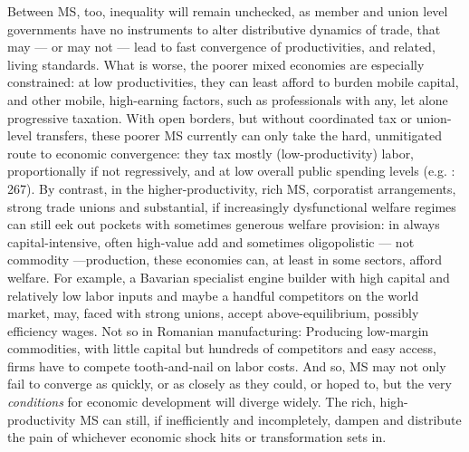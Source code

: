 \documentclass[11pt,a4paper,oneside,openright]{article}
\begin{document}
Between \gls{MS}, too, inequality will remain unchecked, as member and union level governments have no instruments to alter distributive dynamics of trade, that may --- or may not --- lead to fast convergence of productivities, and related, living standards. 
What is worse, the poorer mixed economies are especially constrained: 
at low productivities, they can least afford to burden mobile capital, and other mobile, high-earning factors, such as professionals with any, let alone progressive taxation. 
With open borders, but without coordinated tax or union-level transfers, these poorer \gls{MS} currently can only take the hard, unmitigated route to economic convergence: 
they tax mostly (low-productivity) labor, proportionally if not regressively, and at low overall public spending levels (e.g. \cite{DaudUngl2008}: 267). 
By contrast, in the higher-productivity, rich \gls{MS}, corporatist arrangements, strong trade unions and substantial, if increasingly dysfunctional welfare regimes can still eek out pockets with sometimes generous welfare provision: 
in always capital-intensive, often high-value add and sometimes oligopolistic --- not commodity ---production, these economies can, at least in some sectors, afford welfare. 
For example, a Bavarian specialist engine builder with high capital and relatively low labor inputs and maybe a handful competitors on the world market,  may, faced with strong unions, accept above-equilibrium, possibly efficiency wages. 
Not so in Romanian manufacturing: 
Producing low-margin commodities, with little capital but hundreds of competitors and easy access, firms have to compete tooth-and-nail on labor costs. 
And so, \gls{MS} may not only fail to converge as quickly, or as closely as they could, or hoped to, but the very \emph{conditions} for economic development will diverge widely. 
The rich, high-productivity \gls{MS} can still, if inefficiently and incompletely, dampen and distribute the pain of whichever economic shock hits or transformation sets in. 
\end{document}
